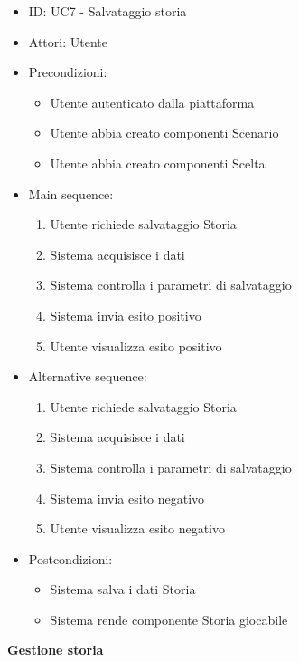 \documentclass{article}
\begin{document}
\begin{itemize}[label = { }]
    \itemsep0px
    \item ID: UC7 - Salvataggio storia
    \item Attori: Utente
    \item Precondizioni: 
        \begin{itemize}[label = {-}]
            \item Utente autenticato dalla piattaforma
            \item Utente abbia creato componenti Scenario
            \item Utente abbia creato componenti Scelta
        \end{itemize}
    \item Main sequence: 
        \begin{enumerate}
            \item Utente richiede salvataggio Storia
            \item Sistema acquisisce i dati
            \item Sistema controlla i parametri di salvataggio
            \item Sistema invia esito positivo
            \item Utente visualizza esito positivo
        \end{enumerate}
    \item Alternative sequence:
        \begin{enumerate}
            \item Utente richiede salvataggio Storia
            \item Sistema acquisisce i dati
            \item Sistema controlla i parametri di salvataggio
            \item Sistema invia esito negativo
            \item Utente visualizza esito negativo
        \end{enumerate}
    \item Postcondizioni: 
        \begin{itemize}[label = {-}]
            \item Sistema salva i dati Storia
            \item Sistema rende componente Storia giocabile
        \end{itemize}
\end{itemize}
\textbf{Gestione storia}
\end{document}
